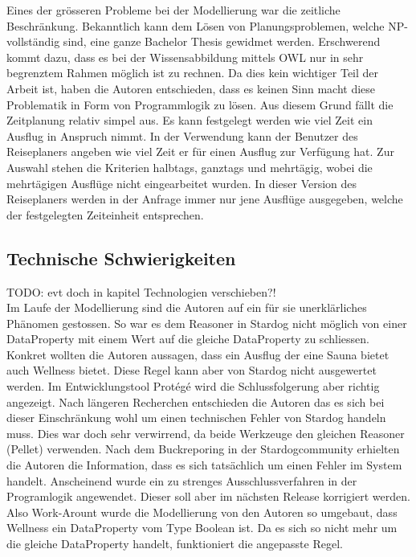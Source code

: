 Eines der grösseren Probleme bei der Modellierung war die zeitliche Beschränkung. Bekanntlich kann dem Lösen von Planungsproblemen, welche NP-vollständig sind, eine ganze Bachelor Thesis gewidmet werden. Erschwerend kommt dazu, dass es bei der Wissensabbildung mittels OWL nur in sehr begrenztem Rahmen möglich ist zu rechnen. Da dies kein wichtiger Teil der Arbeit ist, haben die Autoren entschieden, dass es keinen Sinn macht diese Problematik in Form von Programmlogik zu lösen. Aus diesem Grund fällt die Zeitplanung relativ simpel aus. Es kann festgelegt werden wie viel Zeit ein Ausflug in Anspruch nimmt. In der Verwendung kann der Benutzer des Reiseplaners angeben wie viel Zeit er für einen Ausflug zur Verfügung hat. Zur Auswahl stehen die Kriterien halbtags, ganztags und mehrtägig, wobei die mehrtägigen Ausflüge nicht eingearbeitet wurden. In dieser Version des Reiseplaners werden in der Anfrage immer nur jene Ausflüge ausgegeben, welche der festgelegten Zeiteinheit entsprechen.

\subsection{Technische Schwierigkeiten}
\label{subsec:loesung_modellierung_technischeSchwierigkeiten}
TODO: evt doch in kapitel Technologien verschieben?!\\
Im Laufe der Modellierung sind die Autoren auf ein für sie unerklärliches Phänomen gestossen. So war es dem Reasoner in Stardog nicht möglich von einer DataProperty mit einem Wert auf die gleiche DataProperty zu schliessen. Konkret wollten die Autoren aussagen, dass ein Ausflug der eine Sauna bietet auch Wellness bietet. Diese Regel kann aber von Stardog nicht ausgewertet werden. Im Entwicklungstool Protégé wird die Schlussfolgerung aber richtig angezeigt. Nach längeren Recherchen entschieden die Autoren das es sich bei dieser Einschränkung wohl um einen technischen Fehler von Stardog handeln muss. Dies war doch sehr verwirrend, da beide Werkzeuge den gleichen Reasoner (Pellet) verwenden. Nach dem Buckreporing in der Stardogcommunity erhielten die Autoren die Information, dass es sich tatsächlich um einen Fehler im System handelt. Anscheinend wurde ein zu strenges Ausschlussverfahren in der Programlogik angewendet. Dieser soll aber im nächsten Release korrigiert werden. \\
Also Work-Arount wurde die Modellierung von den Autoren so umgebaut, dass Wellness ein DataProperty vom Type Boolean ist. Da es sich so nicht mehr um die gleiche DataProperty handelt, funktioniert die angepasste Regel.

